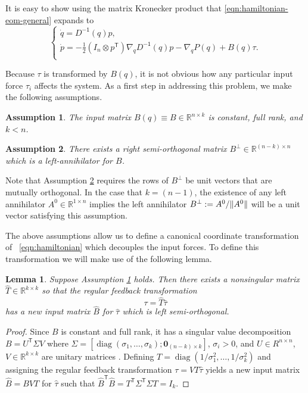 \documentclass[journal,twoside,web]{ieeecolor}
\newtheorem{lemma}[thm]{Lemma} %
\newtheorem{assm}{Assumption} %
\DeclarePairedDelimiter{\norm}{\lVert}{\rVert}
\DeclareMathOperator{\Diag}{diag}
\newcommand*{\diag}[1]{\Diag\left(#1\right)}
\newcommand*{\tpose}{^\mathsf{T}}
\newcommand*{\inv}{^\mathsf{-1}}
\newcommand*{\R}{\mathbb{R}}
\newcommand*{\Id}[1]{I_{#1}}
\newcommand*{\Zmat}[1]{\bm{0}_{#1}}
\begin{document}
It is easy to show using the matrix Kronecker product that
\eqref{eqn:hamiltonian-eom-general} expands to
\begin{equation}\label{eqn:hamiltonian-full-dynamics}
     \begin{cases}
        \dot{q} = D\inv(q)p 
        , \\
        \dot{p} = -\frac{1}{2} (\Id{n} \otimes p\tpose) \nabla_q D\inv(q) p
        - \nabla_q P(q) + B(q) \tau
        . \\
    \end{cases}
\end{equation}

Because \(\tau\) is transformed by \(B(q)\), it is not obvious how any
particular input force \(\tau_i\) affects the system.
As a first step in addressing this problem, we make the following assumptions.

\begin{assm}\label{assm:B-const}
    The input matrix \(B(q) \equiv B \in \R^{n\times k}\) is constant,
    full rank, and \(k < n\).
\end{assm}

\begin{assm}\label{assm:B-perp}
    There exists a right semi-orthogonal matrix 
    \(B^\perp \in \R^{(n-k)\times n}\)
    which is a left-annihilator for \(B\). 
\end{assm}

Note that Assumption \ref{assm:B-perp} requires the rows of \(B^\perp\) be unit vectors
that are mutually orthogonal. 
In the case that \(k = (n-1)\), the existence of any left annihilator 
\(A^0 \in \R^{1\times n}\) implies the left annihilator 
\(B^\perp := A^0/\norm{A^0}\) will be a unit vector satisfying this assumption.

The above assumptions allow us to define a
canonical coordinate transformation of ~\eqref{eqn:hamiltonian} 
which decouples the input forces.
To define this transformation we will make use of the following lemma.

\begin{lemma}\label{lemma:B-orthogonal}
    Suppose Assumption \ref{assm:B-const} holds. Then
    there exists a nonsingular matrix \(\hat{T} \in \R^{k \times k}\) 
    so that the regular feedback transformation 
    \[
        \tau = \hat{T} \hat{\tau}
    \] 
    has a new input matrix \(\hat{B}\) for \(\hat{\tau}\) which is left
    semi-orthogonal.  
\end{lemma}
\begin{proof}
    Since \(B\) is constant and full rank, it has a singular value decomposition 
    \(B = U\tpose \Sigma V\) where 
    \(\Sigma = [\diag{\sigma_1,\ldots,\sigma_k}; \Zmat{(n-k)\times k}]\),
    \(\sigma_i > 0\), and \(U \in R^{n \times n}\),
    \(V \in \R^{k \times k}\) are unitary matrices \cite{calculating_svd}.
    Defining \(T = \diag{1/\sigma_1^2,\ldots,1/\sigma_k^2}\) and assigning the
    regular feedback transformation \(\tau = V T \hat{\tau}\) yields a new input
    matrix \(\hat{B} = B V T\) for \(\hat{\tau}\) such that
    \(\hat{B}\tpose \hat{B} = T\tpose \Sigma\tpose \Sigma T = \Id{k}\).
\end{proof}
\end{document}
